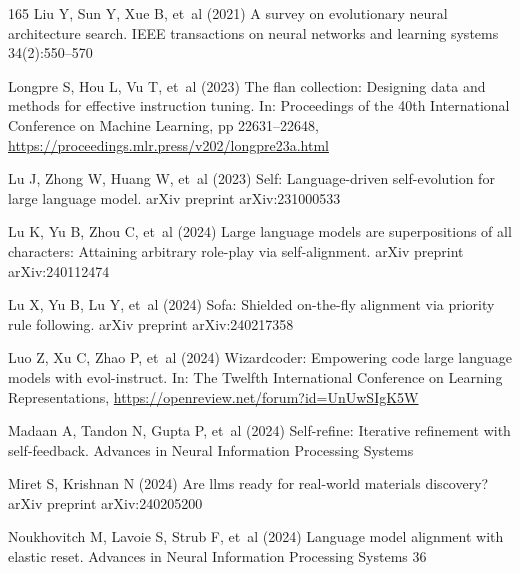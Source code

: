 \documentclass[sn-basic, Numbered]{sn-jnl}%
\theoremstyle{thmstyleone}%
\theoremstyle{thmstyletwo}%
\theoremstyle{thmstylethree}%
\begin{document}
\begin{thebibliography}{165}
Liu Y, Sun Y, Xue B, et~al (2021) A survey on evolutionary neural architecture search. IEEE transactions on neural networks and learning systems 34(2):550--570

Longpre S, Hou L, Vu T, et~al (2023) The flan collection: Designing data and methods for effective instruction tuning. In: Proceedings of the 40th International Conference on Machine Learning, pp 22631--22648, \urlprefix\url{https://proceedings.mlr.press/v202/longpre23a.html}

Lu J, Zhong W, Huang W, et~al (2023) Self: Language-driven self-evolution for large language model. arXiv preprint arXiv:231000533

Lu K, Yu B, Zhou C, et~al (2024{}) Large language models are superpositions of all characters: Attaining arbitrary role-play via self-alignment. arXiv preprint arXiv:240112474

Lu X, Yu B, Lu Y, et~al (2024{}) Sofa: Shielded on-the-fly alignment via priority rule following. arXiv preprint arXiv:240217358

Luo Z, Xu C, Zhao P, et~al (2024) Wizardcoder: Empowering code large language models with evol-instruct. In: The Twelfth International Conference on Learning Representations, \urlprefix\url{https://openreview.net/forum?id=UnUwSIgK5W}

Madaan A, Tandon N, Gupta P, et~al (2024) Self-refine: Iterative refinement with self-feedback. Advances in Neural Information Processing Systems

Miret S, Krishnan N (2024) Are llms ready for real-world materials discovery? arXiv preprint arXiv:240205200

Noukhovitch M, Lavoie S, Strub F, et~al (2024) Language model alignment with elastic reset. Advances in Neural Information Processing Systems 36


\end{thebibliography}
\end{document}
